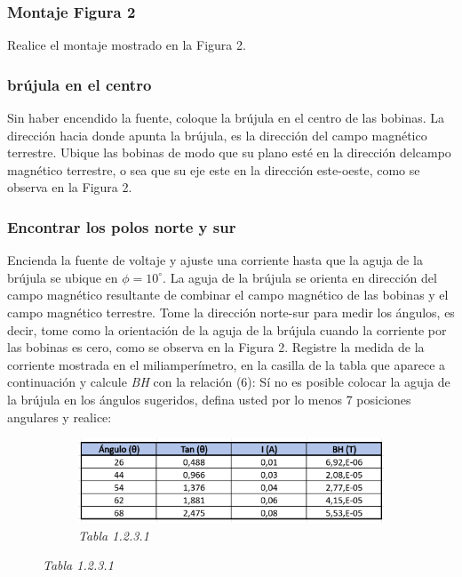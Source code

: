 \subsubsection{Montaje Figura 2}
Realice el montaje mostrado en la Figura 2.


\subsubsection{brújula en el centro}
Sin haber encendido la fuente, coloque la brújula en el centro de las bobinas.
La dirección hacia donde apunta la brújula, es la dirección del campo magnético
terrestre. Ubique las bobinas de modo que su plano esté en la dirección delcampo
magnético terrestre, o sea que su eje este en la dirección este-oeste, como se
observa en la Figura 2.


\subsubsection{Encontrar los polos norte y sur}
Encienda la fuente de voltaje y ajuste una corriente hasta que la aguja de la
brújula se ubique en \(\phi = 10^\circ\). La aguja de la brújula se orienta en dirección del campo
magnético resultante de combinar el campo magnético de las bobinas y el campo
magnético terrestre. Tome la dirección norte-sur para medir los ángulos, es
decir, tome como la orientación de la aguja de la brújula cuando la corriente
por las bobinas es cero, como se observa en la Figura 2. Registre la medida de
la corriente mostrada en el miliamperímetro, en la casilla de la tabla que
aparece a continuación y calcule \textit{BH} con la relación (6): Sí no es posible colocar
la aguja de la brújula en los ángulos sugeridos, defina usted por lo menos 7
posiciones angulares y realice:


\begin{figure}[H]
    \centering
    \begin{subfigure}[b]{\textwidth}
        \centering
        \includegraphics[width=\textwidth]{Figures/0. General/2.3.1.png}
        \caption{\textit{Tabla 1.2.3.1}}
    \end{subfigure}
\end{figure}

